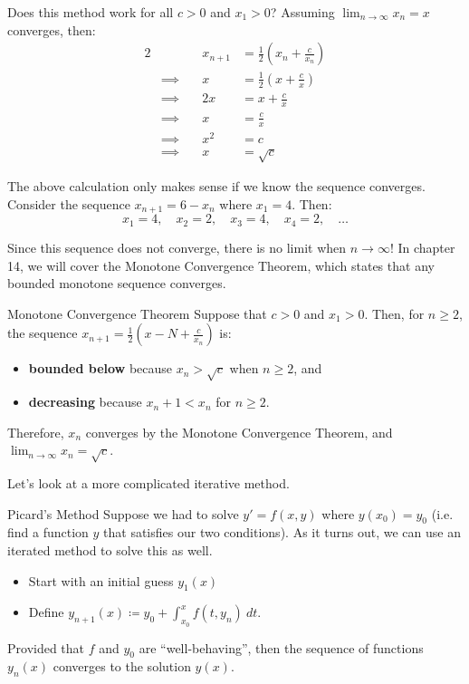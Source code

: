 \documentclass[12pt]{report}
\begin{document}
Does this method work for all $c > 0$ and $x_1 > 0$? Assuming $\lim_{n\to\infty} x_n = x$ converges, then:
\begin{alignat*}{2}
    && x_{n+1} &= \frac{1}{2} \left( x_n + \frac{c}{x_n} \right) \\
    &\implies \quad &x &= \frac{1}{2} \left( x + \frac{c}{x} \right) \\
    &\implies &2x &= x + \frac{c}{x} \\
    &\implies &x &= \frac{c}{x} \\
    &\implies &x^2 &= c \\
    &\implies &x &= \sqrt{c}
\end{alignat*}

The above calculation only makes sense if we know the sequence converges. Consider the sequence $x_{n+1} = 6 - x_n$ where $x_1 = 4$. Then:
\[ x_1 = 4,\quad x_2 = 2,\quad x_3 = 4,\quad x_4 = 2,\quad \ldots \]


Since this sequence does not converge, there is no limit when $n \to \infty$! In chapter 14, we will cover the Monotone Convergence Theorem, which states that any bounded monotone sequence converges.

\begin{exbox}{Monotone Convergence Theorem}{}
    Suppose that $c > 0$ and $x_1 > 0$. Then, for $n \geq 2$, the sequence $x_{n+1} = \frac{1}{2} \left( x-N + \frac{c}{x_n} \right)$ is:
    \begin{itemize}
        \item \textbf{bounded below} because $x_n > \sqrt{c}$ when $n \geq 2$, and
        \item \textbf{decreasing} because $x_n+1 < x_n$ for $n \geq 2$.
    \end{itemize}
    Therefore, $x_n$ converges by the Monotone Convergence Theorem, and $\lim_{n\to\infty} x_n = \sqrt{c}$.
\end{exbox}

Let's look at a more complicated iterative method.

\begin{exbox}{Picard's Method}{}
    Suppose we had to solve $y\prime = f(x,y)$ where $y(x_0) = y_0$ (i.e. find a function $y$ that satisfies our two conditions). As it turns out, we can use an iterated method to solve this as well.
    \begin{itemize}
        \item Start with an initial guess $y_1(x)$
        \item Define $\displaystyle y_{n+1}(x) \coloneq y_0 + \int_{x_0}^{x} f(t, y_n)\ dt$.
    \end{itemize}
    Provided that $f$ and $y_0$ are ``well-behaving'', then the sequence of functions $y_n(x)$ converges to the solution $y(x)$.
\end{exbox}
\end{document}
